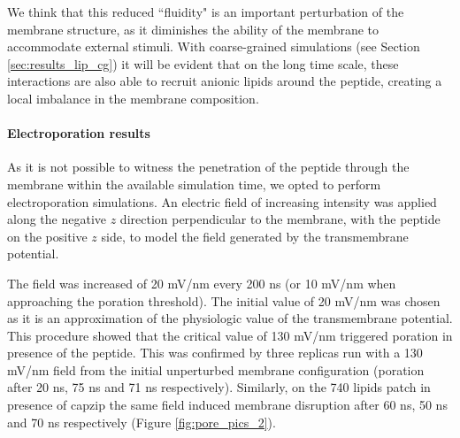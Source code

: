 We think that this reduced ``fluidity" is an important perturbation of the membrane structure, as it diminishes the ability of the membrane to accommodate external stimuli. With coarse-grained simulations (see Section \ref{sec:results_lip_cg}) it will be evident that on the long time scale, these interactions are also able to recruit anionic lipids around the peptide, creating a local imbalance in the membrane composition.


\paragraph{Electroporation results}
As it is not possible to witness the penetration of the peptide through the membrane within the available simulation time, we opted to perform electroporation simulations.
%
An electric field of increasing intensity was applied along the negative $z$ direction perpendicular to the membrane, with the peptide on the positive $z$ side, to model the field generated by the transmembrane potential.

The field was increased of 20 mV/nm every 200 ns (or 10 mV/nm when approaching the poration threshold). The initial value of 20 mV/nm was chosen as it is an approximation of the physiologic value of the transmembrane potential. This procedure showed that the critical value of 130 mV/nm triggered poration in presence of the peptide. 
%
This was confirmed by three replicas run with a 130 mV/nm field from the initial unperturbed membrane configuration (poration after 20 ns, 75 ns and 71 ns respectively).
%
Similarly, on the 740 lipids patch in presence of capzip the same field induced membrane disruption after 60 ns, 50 ns and 70 ns respectively (Figure \ref{fig:pore_pics_2}).

